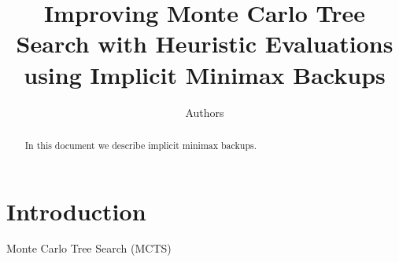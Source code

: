 \documentclass{article}
\begin{document}
\title{Improving Monte Carlo Tree Search with Heuristic Evaluations using Implicit Minimax Backups}

\author{Authors}

\maketitle

\begin{abstract}
In this document we describe implicit minimax backups. 
\end{abstract}

\section{Introduction}

Monte Carlo Tree Search (MCTS)~\cite{Coulom06Efficient,Kocsis06Bandit}




\end{document}
